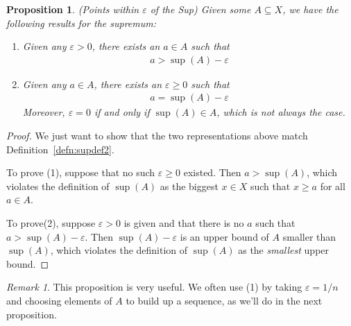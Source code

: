 \documentclass[12pt]{book}
\numberwithin{equation}{section} %
\theoremstyle{plain}
\newtheorem{prop}[thm]{Proposition}
\theoremstyle{definition}
\theoremstyle{remark}
\newtheorem*{rmk}{Remark}
\begin{document}
\begin{prop}\emph{(Points within $\varepsilon$ of the Sup)}
Given some $A\subseteq X$, we have the following results for the
supremum:
\begin{enumerate}
  \item Given any $\varepsilon>0$, there exists an $a\in A$ such that
    \begin{align*}
      a > \sup(A) -\varepsilon
    \end{align*}
  \item Given any $a\in A$, there exists an $\varepsilon\geq 0$ such
    that
    \begin{align*}
      a = \sup(A) - \varepsilon
    \end{align*}
    Moreover, $\varepsilon=0$ if and only if $\sup(A) \in A$, which is
    not always the case.
\end{enumerate}
\end{prop}
\begin{proof}
We just want to show that the two representations above match
Definition~\ref{defn:supdef2}.

To prove (1), suppose that no such $\varepsilon\geq 0$ existed. Then $a
> \sup(A)$, which violates the definition of $\sup(A)$ as the biggest
$x\in X$ such that $x\geq a$ for all $a\in A$.

To prove(2), suppose $\varepsilon>0$ is given and that there is no $a$
such that $a>\sup(A)-\varepsilon$. Then $\sup(A)-\varepsilon$ is an
upper bound of $A$ smaller than $\sup(A)$, which violates the definition
of $\sup(A)$ as the \emph{smallest} upper bound.
\end{proof}
\begin{rmk}
This proposition is very useful. We often use (1) by taking
$\varepsilon=1/n$ and choosing elements of $A$ to build up a sequence,
as we'll do in the next proposition.
\end{rmk}
\end{document}

